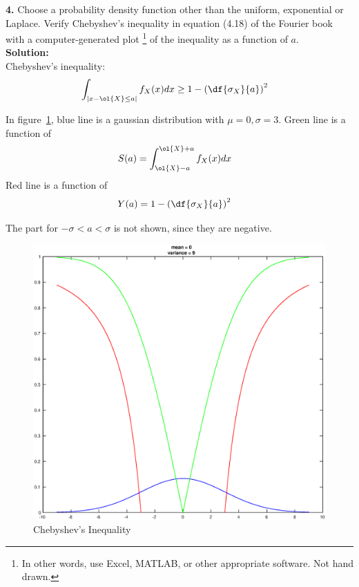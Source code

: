 \textbf{4.} Choose a probability density function other than the uniform, exponential or Laplace. 
Verify Chebyshev's inequality in equation (4.18) of the Fourier book with a computer-generated plot
\footnote{In other words, use Excel, MATLAB, or other appropriate software. Not hand drawn.}
of the inequality as a function of $a$. \\
\textbf{Solution:} \\
Chebyshev's inequality:
\begin{align*}
  \int_{\left| x - \ol{X}\leq a\right|}f_X(x)dx & \geq 1 - \left( \df{\sigma_X}{a} \right)^2
\end{align*}

In figure~\ref{fig:cheby}, blue line is a gaussian distribution with $\mu = 0, \sigma = 3$. 
Green line is a function of
\begin{align*}
  S(a) & = \int_{\ol{X} - a}^{\ol{X} + a}f_X(x)dx
\end{align*}
Red line is a function of
\begin{align*}
  Y(a) & = 1 - \left( \df{\sigma_X}{a} \right)^2
\end{align*}

The part for $-\sigma < a < \sigma$ is not shown, since they are negative.

\begin{figure}[h!]
  \begin{center}
    \includegraphics[width=6in]{chebyshev_inequality.eps}
  \end{center}
  \caption{Chebyshev's Inequality}
  \label{fig:cheby}
\end{figure}

\vspace{.5in}
